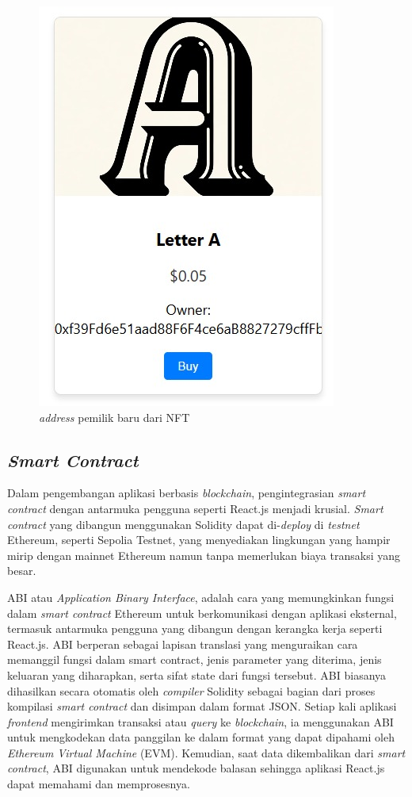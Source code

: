 \begin{figure} [H] \centering
  \includegraphics[scale=0.45]{gambar/new_owner.jpeg}
  \caption{\emph{address} pemilik baru dari NFT}
  \label{fig:owner}
\end{figure}

\subsection{\emph{Smart Contract}}
Dalam pengembangan aplikasi berbasis \emph{blockchain}, pengintegrasian \emph{smart contract} dengan antarmuka pengguna seperti React.js menjadi krusial. \emph{Smart contract} yang dibangun menggunakan Solidity dapat di-\emph{deploy} di \emph{testnet} Ethereum, seperti Sepolia Testnet, yang menyediakan lingkungan yang hampir mirip dengan mainnet Ethereum namun tanpa memerlukan biaya transaksi yang besar. 

ABI atau \emph{Application Binary Interface}, adalah cara yang memungkinkan fungsi dalam \emph{smart contract} Ethereum untuk berkomunikasi dengan aplikasi eksternal, termasuk antarmuka pengguna yang dibangun dengan kerangka kerja seperti React.js. ABI berperan sebagai lapisan translasi yang menguraikan cara memanggil fungsi dalam smart contract, jenis parameter yang diterima, jenis keluaran yang diharapkan, serta sifat state dari fungsi tersebut. ABI biasanya dihasilkan secara otomatis oleh \emph{compiler} Solidity sebagai bagian dari proses kompilasi \emph{smart contract} dan disimpan dalam format JSON. Setiap kali aplikasi \emph{frontend} mengirimkan transaksi atau \emph{query} ke \emph{blockchain}, ia menggunakan ABI untuk mengkodekan data panggilan ke dalam format yang dapat dipahami oleh \emph{Ethereum Virtual Machine} (EVM). Kemudian, saat data dikembalikan dari \emph{smart contract}, ABI digunakan untuk mendekode balasan sehingga aplikasi React.js dapat memahami dan memprosesnya.

